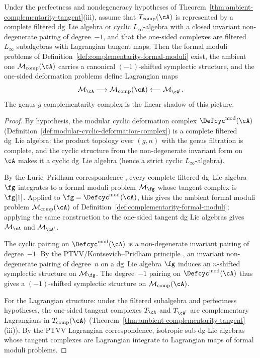 \begin{theorem}
\label{thm:ambient-complementarity-fmp}
\ClaimStatusConditional
Under the perfectness and nondegeneracy hypotheses of
Theorem~\textup{\ref{thm:ambient-complementarity-tangent}(iii)},
assume that $T_{\mathrm{comp}}(\cA)$ is represented by a complete
filtered dg~Lie algebra or cyclic $L_\infty$-algebra with a closed
invariant non-degenerate pairing of degree~$-1$, and that the
one-sided complexes are filtered $L_\infty$ subalgebras with
Lagrangian tangent maps. Then the formal moduli problems of
Definition~\ref{def:complementarity-formal-moduli} exist, the ambient
one \(\mathcal{M}_{\mathrm{comp}}(\cA)\) carries a canonical
$(-1)$-shifted symplectic structure, and the one-sided deformation
problems define Lagrangian maps
\[
\mathcal{M}_{\cA}
\longrightarrow
\mathcal{M}_{\mathrm{comp}}(\cA)
\longleftarrow
\mathcal{M}_{\cA^!}.
\]
The genus-$g$ complementarity complex is the linear shadow of this
picture.
\end{theorem}

\begin{proof}
By hypothesis, the modular cyclic deformation complex
$\Defcyc^{\mathrm{mod}}(\cA)$
(Definition~\ref{def:modular-cyclic-deformation-complex})
is a complete filtered dg~Lie algebra: the product topology over
$(g,n)$ with the genus filtration is complete, and the cyclic
structure from the non-degenerate invariant form on~$\cA$ makes it
a cyclic dg~Lie algebra (hence a strict cyclic $L_\infty$-algebra).

By the Lurie--Pridham correspondence
\cite{LurieDAGX, Pridham17},
every complete filtered dg~Lie algebra $\fg$ integrates to a
formal moduli problem $\mathcal{M}_\fg$
whose tangent complex is $\fg[1]$.
Applied to $\fg = \Defcyc^{\mathrm{mod}}(\cA)$, this gives
the ambient formal moduli problem
$\mathcal{M}_{\mathrm{comp}}(\cA)$ of
Definition~\ref{def:complementarity-formal-moduli}; applying the same
construction to the one-sided tangent dg Lie algebras gives
$\mathcal M_\cA$ and $\mathcal M_{\cA^!}$.

The cyclic pairing on $\Defcyc^{\mathrm{mod}}(\cA)$ is a
non-degenerate invariant pairing of degree~$-1$. By the
PTVV/Kontsevich--Pridham principle \cite{PTVV13,Pridham17}, an
invariant non-degenerate pairing of degree~$n$ on a dg~Lie
algebra $\fg$ induces an $n$-shifted symplectic structure
on $\mathcal{M}_\fg$. The degree~$-1$ pairing on
$\Defcyc^{\mathrm{mod}}(\cA)$ thus gives a
$(-1)$-shifted symplectic structure on
$\mathcal{M}_{\mathrm{comp}}(\cA)$.

For the Lagrangian structure: under the filtered subalgebra and
perfectness hypotheses,
the one-sided tangent complexes $T_\cA$ and $T_{\cA^!}$ are
complementary Lagrangians in $T_{\mathrm{comp}}(\cA)$
(Theorem~\ref{thm:ambient-complementarity-tangent}(iii)).
By the PTVV Lagrangian correspondence, isotropic sub-dg-Lie
algebras whose tangent complexes are Lagrangian
integrate to Lagrangian maps of formal moduli problems.
\end{proof}

